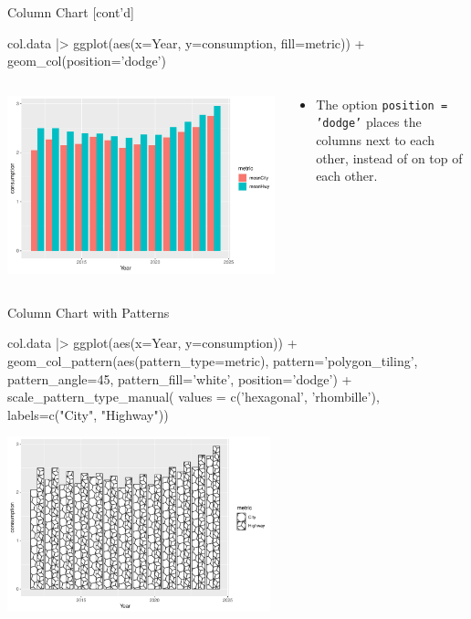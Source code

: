 \documentclass[ignorenonframetext,xcolor=x11names]{beamer}
\begin{document}
\begin{frame}[fragile]{Column Chart \small [cont'd]}
\begin{Rcode}
col.data |> 
   ggplot(aes(x=Year, y=consumption, fill=metric)) +
      geom_col(position='dodge')
\end{Rcode}
\begin{columns}
\begin{column}{.75\textwidth}
  \includegraphics[width=\textwidth]{fuel.columns.pdf}
\end{column}
\begin{column}{.35\textwidth}
\footnotesize
\begin{itemize}
   \item The option \texttt{position = 'dodge'} places the columns next to each other, instead of on top of each other.
\end{itemize}
\end{column}
\end{columns}
\end{frame}


\begin{frame}[fragile]{Column Chart with Patterns}
\begin{Rcode}
col.data |> ggplot(aes(x=Year, y=consumption)) +
    geom_col_pattern(aes(pattern_type=metric),
          pattern='polygon_tiling', pattern_angle=45,
          pattern_fill='white', position='dodge') +
    scale_pattern_type_manual(
       values = c('hexagonal', 'rhombille'), 
       labels=c("City", "Highway"))
\end{Rcode}
\begin{center}
  \includegraphics[height=2in]{fuel.columnsPatterns.pdf}
\end{center}
\end{frame}
\end{document}
